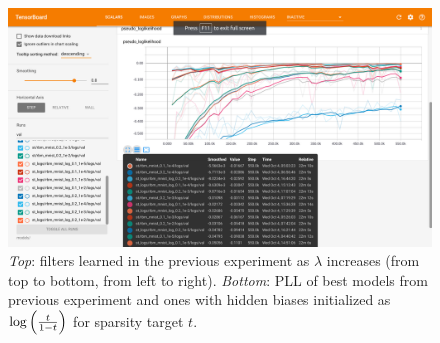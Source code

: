 \begin{figure}[t!]
\begin{mdframed}
\medskip

\includegraphics[width=.9\textwidth]{rbm-mnist/st_st_log_pll.png}
\caption{\emph{Top}: filters learned in the previous experiment as $\lambda$ increases (from top to bottom, from left to right). \emph{Bottom}: PLL of best models from previous experiment and ones with hidden biases initialized as $\log\left(\frac{t}{1-t}\right)$ for sparsity target $t$.}
\end{mdframed}
\end{figure}

\clearpage


